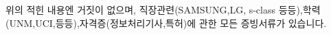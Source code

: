 \documentclass[a4paper,10pt]{article} %
\begin{document}



\bigskip
\section{}
 \footnotesize{ 위의 적힌 내용엔 거짓이 없으며,  직장관련(SAMSUNG,LG, s-class 등등),학력(UNM,UCI,등등),자격증(정보처리기사,특허)에 관한 모든 증빙서류가 있습니다.}
\end{document}
